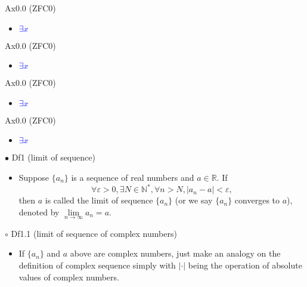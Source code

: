 \documentclass{article}
\begin{document}
{\Large Ax0.0 (ZFC0)}\par
\begin{itemize}
    \item[]
    {\large \textcolor{blue}{$\exists x$}}\par
    {\textcolor{pf}{}}
\end{itemize}\par
\quad

{\Large Ax0.0 (ZFC0)}\par
\begin{itemize}
    \item[]
    {\large \textcolor{blue}{$\exists x$}}\par
    {\textcolor{pf}{}}
\end{itemize}\par
\quad

{\Large Ax0.0 (ZFC0)}\par
\begin{itemize}
    \item[]
    {\large \textcolor{blue}{$\exists x$}}\par
    {\textcolor{pf}{}}
\end{itemize}\par
\quad

{\Large Ax0.0 (ZFC0)}\par
\begin{itemize}
    \item[]
    {\large \textcolor{blue}{$\exists x$}}\par
    {\textcolor{pf}{}}
\end{itemize}\par
\quad





{\Large $\bullet $ Df1 (limit of sequence)}\par
\begin{itemize}
    \item[]
    {\large Suppose $\{a_n\}$ is a sequence of real numbers and $a\in \mathbb{R} $. If
    $$\forall\varepsilon>0, \exists N \in \mathbb{N}^{\ast}, \forall n>N, \left|a_n-a\right|<\varepsilon, $$
    then $a$ is called the limit of sequence $\{a_n\}$ (or we say $\{a_n\}$ converges to $a$), 
    denoted by $\lim\limits_{n \to \infty} a_n=a $.}
\end{itemize}\par
\quad

{\Large $\circ $ Df1.1 (limit of sequence of complex numbers)}\par
\begin{itemize}
    \item[]
    {\large If $\{a_n\}$ and $a$ above are complex numbers, 
    just make an analogy on the definition of complex sequence 
    simply with $|\cdot |$ being the operation of absolute values of complex numbers.}
\end{itemize}\par
\quad
\end{document}

